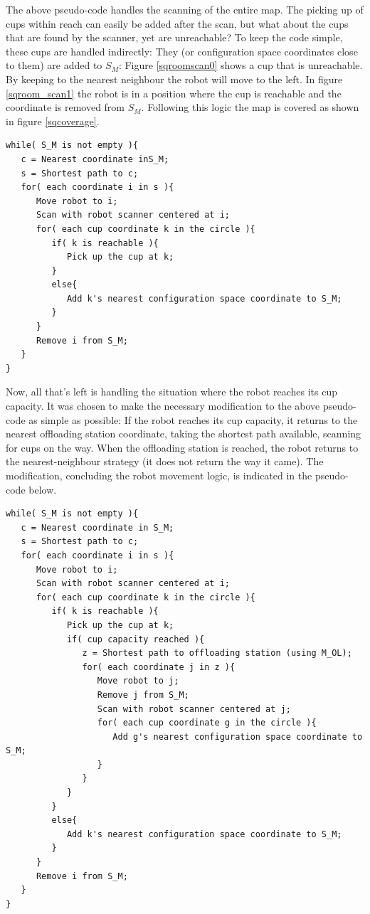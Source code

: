 The above pseudo-code handles the scanning of the entire map.
The picking up of cups within reach can easily be added after the scan,
but what about the cups that are found by the scanner, yet are unreachable?
To keep the code simple, these cups are handled indirectly: They (or configuration space coordinates close to them) are added to \(S_{M}\):
Figure \ref{sqroomscan0} shows a cup that is unreachable. 
By keeping to the nearest neighbour the robot will move to the left. 
In figure \ref{sqroom_scan1} the robot is in a position where the cup is reachable and the coordinate is removed from \(S_{M}\). 
Following this logic the map is covered as shown in figure \ref{sqcoverage}. 

\begin{verbatim}
while( S_M is not empty ){
   c = Nearest coordinate inS_M;
   s = Shortest path to c;
   for( each coordinate i in s ){
      Move robot to i;
      Scan with robot scanner centered at i;
      for( each cup coordinate k in the circle ){
         if( k is reachable ){
            Pick up the cup at k;
         }
         else{
            Add k's nearest configuration space coordinate to S_M;
         }
      }
      Remove i from S_M;
   }
}
\end{verbatim}

Now, all that's left is handling the situation where the robot reaches its cup capacity.
It was chosen to make the necessary modification to the above pseudo-code as simple as possible:
If the robot reaches its cup capacity, it returns to the nearest offloading station coordinate,
taking the shortest path available, scanning for cups on the way. When the offloading station is reached,
the robot returns to the nearest-neighbour strategy (it does not return the way it came).
The modification, concluding the robot movement logic, is indicated in the pseudo-code below.

\begin{verbatim}
while( S_M is not empty ){
   c = Nearest coordinate in S_M;
   s = Shortest path to c;
   for( each coordinate i in s ){
      Move robot to i;
      Scan with robot scanner centered at i;
      for( each cup coordinate k in the circle ){
         if( k is reachable ){
            Pick up the cup at k;
            if( cup capacity reached ){
               z = Shortest path to offloading station (using M_OL);
               for( each coordinate j in z ){
                  Move robot to j;
                  Remove j from S_M;
                  Scan with robot scanner centered at j;
                  for( each cup coordinate g in the circle ){
                     Add g's nearest configuration space coordinate to S_M;
                  }
               }
            }
         }
         else{
            Add k's nearest configuration space coordinate to S_M;
         }
      }
      Remove i from S_M;
   }
}
\end{verbatim}

